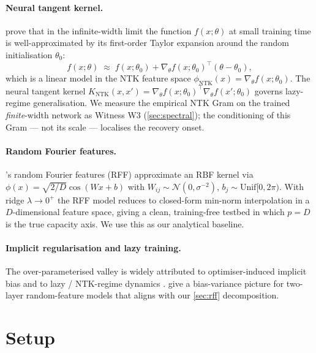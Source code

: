 \documentclass{article}
\begin{document}
\paragraph{Neural tangent kernel.} \citet{jacot2018neural} prove that in the infinite-width limit the function $f(x;\theta)$ at small training time is well-approximated by its first-order Taylor expansion around the random initialisation $\theta_0$:
\begin{equation}
  \label{eq:ntk}
  f(x;\theta) \;\approx\; f(x;\theta_0) + \nabla_\theta f(x;\theta_0)^\top(\theta - \theta_0),
\end{equation}
which is a linear model in the NTK feature space $\phi_{\mathrm{NTK}}(x) = \nabla_\theta f(x;\theta_0)$. The neural tangent kernel $K_{\mathrm{NTK}}(x,x') = \nabla_\theta f(x;\theta_0)^\top \nabla_\theta f(x';\theta_0)$ governs lazy-regime generalisation. We measure the empirical NTK Gram on the trained \emph{finite}-width network as Witness W3 (\cref{sec:spectral}); the conditioning of this Gram --- not its scale --- localises the recovery onset.

\paragraph{Random Fourier features.} \citet{rahimi2007random}'s random Fourier features (RFF) approximate an RBF kernel via $\phi(x) = \sqrt{2/D}\cos(Wx+b)$ with $W_{ij}\sim\mathcal{N}(0,\sigma^{-2})$, $b_j\sim\mathrm{Unif}[0,2\pi)$. With ridge $\lambda\to0^+$ the RFF model reduces to closed-form min-norm interpolation in a $D$-dimensional feature space, giving a clean, training-free testbed in which $p=D$ is the true capacity axis. We use this as our analytical baseline.

\paragraph{Implicit regularisation and lazy training.} The over-parameterised valley is widely attributed to optimiser-induced implicit bias \citep{gunasekar2017implicit,ji2019implicit} and to lazy / NTK-regime dynamics \citep{chizat2018global,du2019gradient}. \citet{dascoli2020double} give a bias-variance picture for two-layer random-feature models that aligns with our \cref{sec:rff} decomposition.

\section{Setup}
\label{sec:setup}
\end{document}
